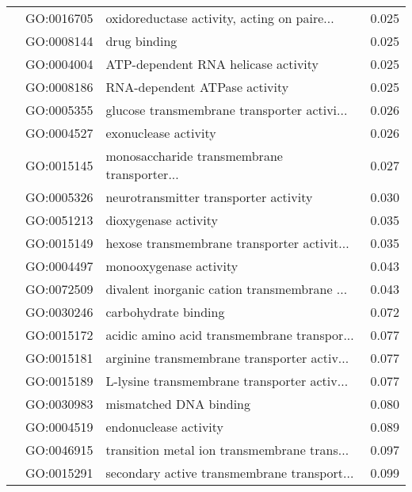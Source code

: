 \begin{longtable}{lllr}
   & GO:0016705 &  oxidoreductase activity, acting on paire... &         0.025 \\
   & GO:0008144 &                                 drug binding &         0.025 \\
   & GO:0004004 &          ATP-dependent RNA helicase activity &         0.025 \\
   & GO:0008186 &                RNA-dependent ATPase activity &         0.025 \\
   & GO:0005355 &  glucose transmembrane transporter activi... &         0.026 \\
   & GO:0004527 &                         exonuclease activity &         0.026 \\
   & GO:0015145 &  monosaccharide transmembrane transporter... &         0.027 \\
   & GO:0005326 &        neurotransmitter transporter activity &         0.030 \\
   & GO:0051213 &                         dioxygenase activity &         0.035 \\
   & GO:0015149 &  hexose transmembrane transporter activit... &         0.035 \\
   & GO:0004497 &                       monooxygenase activity &         0.043 \\
   & GO:0072509 &  divalent inorganic cation transmembrane ... &         0.043 \\
   & GO:0030246 &                         carbohydrate binding &         0.072 \\
   & GO:0015172 &  acidic amino acid transmembrane transpor... &         0.077 \\
   & GO:0015181 &  arginine transmembrane transporter activ... &         0.077 \\
   & GO:0015189 &  L-lysine transmembrane transporter activ... &         0.077 \\
   & GO:0030983 &                       mismatched DNA binding &         0.080 \\
   & GO:0004519 &                        endonuclease activity &         0.089 \\
   & GO:0046915 &  transition metal ion transmembrane trans... &         0.097 \\
   & GO:0015291 &  secondary active transmembrane transport... &         0.099 \\
\end{longtable}
